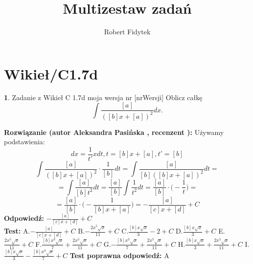 \documentclass[12pt, a4paper]{article}
\title{Multizestaw zadań}
\author{Robert Fidytek}
\date{}
\theoremstyle{definition} %
\newtheorem{zad}{}
\newcommand{\kategoria}[1]{\section{#1}} %
\newcommand{\zadStart}[1]{\begin{zad}#1\newline} %
\newcommand{\zadStop}{\end{zad}}   %
\newcommand{\rozwStart}[2]{\noindent \textbf{Rozwiązanie (autor #1 , recenzent #2): }\newline} %
\newcommand{\rozwStop}{\newline}                                            %
\newcommand{\odpStart}{\noindent \textbf{Odpowiedź:}\newline}    %
\newcommand{\odpStop}{\newline}                                             %
\newcommand{\testStart}{\noindent \textbf{Test:}\newline} %
\newcommand{\testStop}{\newline} %
\newcommand{\kluczStart}{\noindent \textbf{Test poprawna odpowiedź:}\newline} %
\newcommand{\kluczStop}{\newline} %
\begin{document}
\maketitle


\kategoria{Wikieł/C1.7d}
\zadStart{Zadanie z Wikieł C 1.7d moja wersja nr [nrWersji]}
Oblicz całkę $$\int \frac{[a]}{([b]x+[a])^{2}}dx.$$
\zadStop
\rozwStart{Aleksandra Pasińska}{}
Używamy podstawienia:
$$dx=\frac{1}{t'}xdt,t=[b]x+[a], t'=[b]$$
$$\int \frac{[a]}{([b]x+[a])^2}\cdot \frac{1}{[b]}dt=\int \frac{[a]}{[b]([b]x+[a])^2}dt=$$
$$=\int \frac{[a]}{[b]t^2}dt=\frac{[a]}{[b]}\int \frac{1}{t^2}dt=\frac{[a]}{[b]}\cdot \bigg(-\frac{1}{t}\bigg)=$$
$$=\frac{[a]}{[b]}\cdot \bigg(-\frac{1}{[b]x+[a]}\bigg)=-\frac{[a]}{[c]x+[d]}+C$$
\rozwStop
\odpStart
$-\frac{[a]}{[c]x+[d]}+C$\\
\odpStop
\testStart
A.$-\frac{[a]}{[c]x+[d]}+C$
B.$-\frac{2x^5\sqrt{x}}{11}+C$
C.$\frac{[b]x\sqrt{x}}{3}-2+C$
D.$\frac{[b]x\sqrt{x}}{3}+C$
E.$\frac{2x^5\sqrt{x}}{11}+C$
F.$\frac{[b]x^3\sqrt{x}}{7}+\frac{2x^5\sqrt{x}}{11}+C$
G.$-\frac{[b]x^3\sqrt{x}}{7}+\frac{2x^5\sqrt{x}}{11}+C$
H.$\frac{[b]x\sqrt{x}}{3}+\frac{2x^5\sqrt{x}}{11}+C$
I.$\frac{[b]x\sqrt{x}}{3}-\frac{[b]x^3\sqrt{x}}{7}+C$
\testStop
\kluczStart
A
\kluczStop
\end{document}
